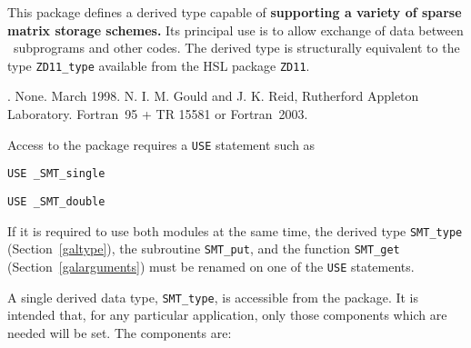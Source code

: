 \documentclass{galahad}
\newcommand{\packagename}{SMT}
\newcommand{\fullpackagename}{\libraryname\_\packagename}
\begin{document}
\galheader


\galsummary
This package defines a derived type capable of {\bf supporting
a variety of sparse matrix storage schemes.} Its principal use is
to allow exchange of data between \galahad\ subprograms
and other codes. The derived type is structurally equivalent to
the type {\tt ZD11\_type} available from the HSL package {\tt ZD11}.


\galattributes
\galversions{\tt  \fullpackagename\_single, \fullpackagename\_double}.
\galuses None.
\galdate March 1998.
\galorigin N. I. M. Gould and J. K. Reid, Rutherford Appleton Laboratory.
\gallanguage Fortran~95 + TR 15581 or Fortran~2003.


\galhowto


Access to the package requires a {\tt USE} statement such as

\medskip{}

\hspace{8mm} {\tt USE \fullpackagename\_single}

\medskip{}

\hspace{8mm} {\tt USE  \fullpackagename\_double}

\medskip

\noindent
If it is required to use both modules at the same time, the derived type
{\tt \packagename\_type}
(Section~\ref{galtype}),
the subroutine
{\tt \packagename\_put},
and the function
{\tt \packagename\_get}
(Section~\ref{galarguments})
must be renamed on one of the {\tt USE} statements.


\galtype
A single derived data type, {\tt \packagename\_type},
is accessible from the package. It is intended that, for any particular
application, only those components which are needed will be set.
The components are:
\end{document}
